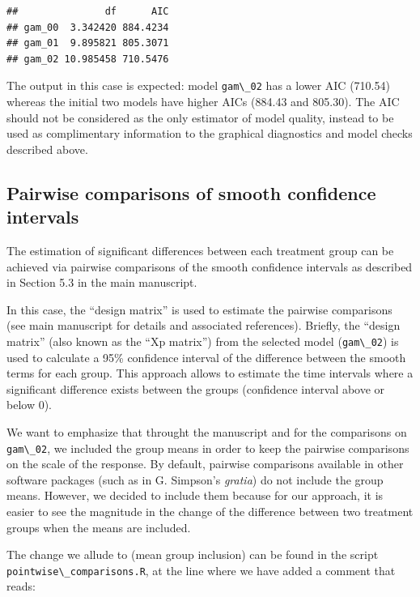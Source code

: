 \documentclass[
]{article}
\newcommand{\passthrough}[1]{#1}
\begin{document}
\begin{lstlisting}
##               df      AIC
## gam_00  3.342420 884.4234
## gam_01  9.895821 805.3071
## gam_02 10.985458 710.5476
\end{lstlisting}

The output in this case is expected: model \passthrough{\lstinline!gam\_02!} has a lower AIC (710.54) whereas the initial two models have higher AICs (884.43 and 805.30). The AIC should not be considered as the only estimator of model quality, instead to be used as complimentary information to the graphical diagnostics and model checks described above.

\hypertarget{pairwise-comparisons-of-smooth-confidence-intervals}{%
\subsection{Pairwise comparisons of smooth confidence intervals}\label{pairwise-comparisons-of-smooth-confidence-intervals}}

The estimation of significant differences between each treatment group can be achieved via pairwise comparisons of the smooth confidence intervals as described in Section 5.3 in the main manuscript.

In this case, the ``design matrix'' is used to estimate the pairwise comparisons (see main manuscript for details and associated references). Briefly, the ``design matrix'' (also known as the ``Xp matrix'') from the selected model (\passthrough{\lstinline!gam\_02!}) is used to calculate a 95\% confidence interval of the difference between the smooth terms for each group. This approach allows to estimate the time intervals where a significant difference exists between the groups (confidence interval above or below 0).

We want to emphasize that throught the manuscript and for the comparisons on \passthrough{\lstinline!gam\_02!}, we included the group means in order to keep the pairwise comparisons on the scale of the response. By default, pairwise comparisons available in other software packages (such as in G. Simpson's \emph{gratia}) do not include the group means. However, we decided to include them because for our approach, it is easier to see the magnitude in the change of the difference between two treatment groups when the means are included.

The change we allude to (mean group inclusion) can be found in the script \passthrough{\lstinline!pointwise\_comparisons.R!}, at the line where we have added a comment that reads:
\end{document}

